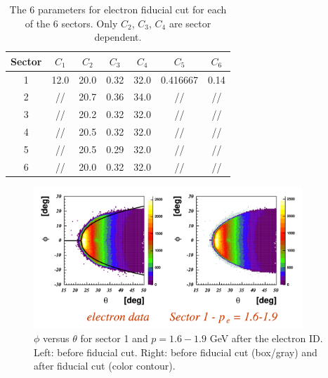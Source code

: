 \begin{table}[h]
    \begin{center}
        \begin{tabular}{|c|c|c|c|c|c|c|}
            \hline
            Sector & $C_1$ & $C_2$ & $C_3$ & $C_4$ & $C_5$    & $C_6$ \\
            \hline
            1      & 12.0  & 20.0  & 0.32  & 32.0  & 0.416667 & 0.14  \\
            2      & //    & 20.7  & 0.36  & 34.0  & //       & //    \\
            3      & //    & 20.2  & 0.32  & 32.0  & //       & //    \\
            4      & //    & 20.5  & 0.32  & 32.0  & //       & //    \\
            5      & //    & 20.5  & 0.29  & 32.0  & //       & //    \\
            6      & //    & 20.0  & 0.32  & 32.0  & //       & //    \\
            \hline
        \end{tabular}
    \end{center}
    \caption[The 6 parameters for electron fiducial cut for each of the 6 sectors.]
    { The 6 parameters for electron fiducial cut for each of the 6 sectors.
    Only $C_2$, $C_3$, $C_4$ are sector dependent. }
    \label{tab:fid_epars}
\end{table}


\begin{figure}[h]
    \centering
    \includegraphics[width=0.9\textwidth ]{img/electron_tph}
    \caption{$\phi$ versus $\theta$ for sector 1 and $p=1.6-1.9$ GeV after the
    electron ID. Left: before fiducial cut. Right: before fiducial cut
        (box/gray) and after fiducial cut (color contour). }
    \label{fig:fidu_etph}
\end{figure}

